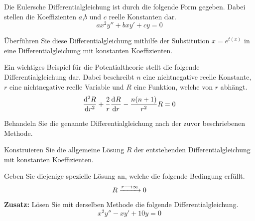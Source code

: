 \begin{atiTask}[
	title = Die homogene Euler-Gleichung,
	topic = Gewöhnliche Differentialgleichungen,
	subtopic = Die lineare homogene Differentialgleichung 2. Ordnung mit konstanten Koeffizienten,
	language = Deutsch,
]
	Die Eulersche Differentialgleichung ist durch die folgende Form gegeben.
	Dabei stellen die Koeffizienten $a$,$b$ und $c$ reelle Konstanten dar.
	\[
		ax^2y'' + bxy' + cy = 0
	\]
	\begin{atiSubtasks}
		\item{
			Überführen Sie diese Differentialgleichung mithilfe der Substitution $x = e^{t(x)}$ in eine Differentialgleichung mit konstanten Koeffizienten.
		}
		\item{
			Ein wichtiges Beispiel für die Potentialtheorie stellt die folgende Differentialgleichung dar.
			Dabei beschreibt $n$ eine nichtnegative reelle Konstante, $r$ eine nichtnegative reelle Variable und $R$ eine Funktion, welche von $r$ abhängt.
			\[
				\nfdrv[2]{R}{r} + \frac{2}{r}\nfdrv{R}{r} - \frac{n(n+1)}{r^2}R = 0
			\]
			\begin{atiSubsubtasks}
				\item{
					Behandeln Sie die genannte Differentialgleichung nach der zuvor beschriebenen Methode.
				}
				\item{
					Konstruieren Sie die allgemeine Lösung $R$ der entstehenden Differentialgleichung mit konstanten Koeffizienten.
				}
				\item{
					Geben Sie diejenige spezielle Lösung an, welche die folgende Bedingung erfüllt.
					\[
						R\conv[r\conv\infty]0
					\]
				}
			\end{atiSubsubtasks}
		}
		\item{
			\textbf{Zusatz:}
			Lösen Sie mit derselben Methode die folgende Differentialgleichung.
			\[
				x^2y'' - xy' + 10y = 0
			\]
		}
	\end{atiSubtasks}
\end{atiTask}